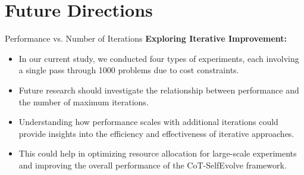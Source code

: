\section{Future Directions}

\begin{frame}{Performance vs. Number of Iterations}
    \textbf{Exploring Iterative Improvement:}
    \begin{itemize}
        \item In our current study, we conducted four types of experiments, each involving a single pass through 1000 problems due to cost constraints.

        \item Future research should investigate the relationship between performance and the number of maximum iterations.

        \item Understanding how performance scales with additional iterations could provide insights into the efficiency and effectiveness of iterative approaches.

        \item This could help in optimizing resource allocation for large-scale experiments and improving the overall performance of the CoT-SelfEvolve framework.
    \end{itemize}
\end{frame}

